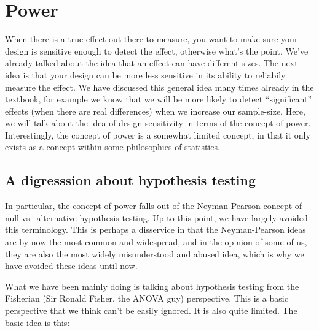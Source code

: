 \documentclass[
  letterpaper,
  DIV=11,
  numbers=noendperiod]{scrreprt}
\begin{document}
\section{Power}\label{power-1}

When there is a true effect out there to measure, you want to make sure
your design is sensitive enough to detect the effect, otherwise what's
the point. We've already talked about the idea that an effect can have
different sizes. The next idea is that your design can be more less
sensitive in its ability to reliabily measure the effect. We have
discussed this general idea many times already in the textbook, for
example we know that we will be more likely to detect ``significant''
effects (when there are real differences) when we increase our
sample-size. Here, we will talk about the idea of design sensitivity in
terms of the concept of power. Interestingly, the concept of power is a
somewhat limited concept, in that it only exists as a concept within
some philosophies of statistics.

\subsection{A digresssion about hypothesis
testing}\label{a-digresssion-about-hypothesis-testing}

In particular, the concept of power falls out of the Neyman-Pearson
concept of null vs.~alternative hypothesis testing. Up to this point, we
have largely avoided this terminology. This is perhaps a disservice in
that the Neyman-Pearson ideas are by now the most common and widespread,
and in the opinion of some of us, they are also the most widely
misunderstood and abused idea, which is why we have avoided these ideas
until now.

What we have been mainly doing is talking about hypothesis testing from
the Fisherian (Sir Ronald Fisher, the ANOVA guy) perspective. This is a
basic perspective that we think can't be easily ignored. It is also
quite limited. The basic idea is this:
\end{document}
